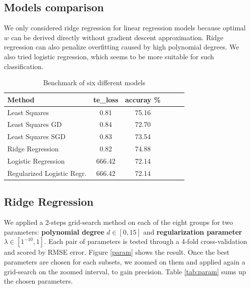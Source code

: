 \documentclass[10pt,conference,compsocconf]{IEEEtran}
\begin{document}
\subsection{Models comparison}





We only considered ridge regression for linear regression models because optimal $w$ can be derived directly without gradient descent approximation. Ridge regression can also penalize overfitting caused by high polynomial degrees. We also tried logistic regression, which seems to be more suitable for such classification.


\begin{table}[htbp]
  \centering
  \begin{tabular}[c]{| l | c | c | l | c | c |}
    \hline
    Method 	     & te\_loss & accuray \% \\
    \hline
    \hline 
    Least Squares 			& 0.81		& 75.16	    \\
    Least Squares GD 		& 0.84		& 72.70 	    \\
    Least Squares SGD 		& 0.83		& 73.54	    \\
    Ridge Regression 			& 0.82  		& 74.88	\\
    Logistic Regression		& 666.42  		& 72.14 	\\
    Regularized Logistic Regr.  	& 666.42  		& 72.14 	\\
\hline
  \end{tabular}
  \caption{Benchmark of six different models}
  \label{tab:methods}
\end{table}


\subsection{Ridge Regression}
We applied a 2-steps grid-search method on each of the eight groups for two parameters: \textbf{polynomial degree} $d \in [0, 15]$ and \textbf{regularization parameter} $\lambda \in [1^{-10}, 1]$.  Each pair of parameters is tested through a 4-fold cross-validation and scored by RMSE error. Figure \ref{param} shows the result. {\color{red}Once the best parameters are chosen for each subsets, we zoomed on them and applied again a grid-search on the zoomed interval, to gain precision}. Table \ref{tab:param} sums up the chosen parameters.
\end{document}
